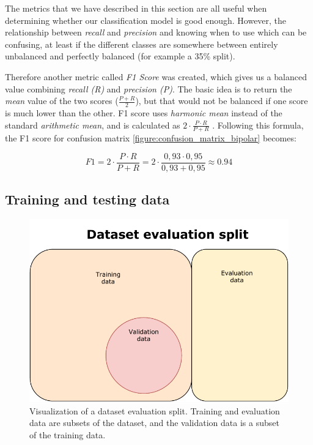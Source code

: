 The metrics that we have described in this section are all useful when determining whether our classification model is good enough. However, the relationship between \textit{recall} and \textit{precision} and knowing when to use which can be confusing, at least if the different classes are somewhere between entirely unbalanced and perfectly balanced (for example a 35\% split). 

Therefore another metric called \textit{F1 Score} was created, which gives us a balanced value combining \textit{recall (R)} and \textit{precision (P)}. The basic idea is to return the \textit{mean} value of the two scores ($ \frac{P + R}{2} $), but that would not be balanced if one score is much lower than the other. F1 score uses \textit{harmonic mean} instead of the standard \textit{arithmetic mean}, and is calculated as $ 2 \cdot \frac{P \cdot R}{P + R} $ \cite{ml_metrics}. 
Following this formula, the F1 score for confusion matrix \ref{figure:confusion_matrix_bipolar} becomes:

\[
  F1 = 2 \cdot \frac{P \cdot R}{P + R} = 2 \cdot \frac{0,93 \cdot 0,95}{0,93 + 0,95} \approx 0.94
\]

\subsection{Training and testing data}
\begin{figure}[!ht]
  \includegraphics{img/train_test_data.pdf}
  \caption{Visualization of a dataset evaluation split. Training and evaluation data are subsets of the dataset, and the validation data is a subset of the training data.}
  \label{figure:dataset_train_test}
\end{figure}


